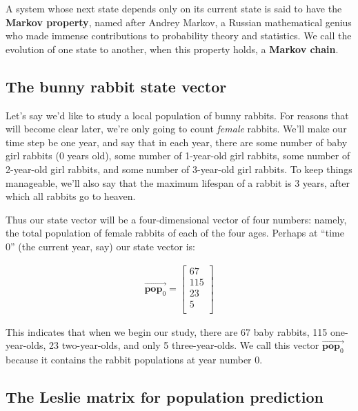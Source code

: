 
A system whose next state depends only on its current state is said to have the
\textbf{Markov property}, named after Andrey Markov, a Russian mathematical
genius who made immense contributions to probability theory and statistics. We
call the evolution of one state to another, when this property holds, a
\textbf{Markov chain}.

\subsection{The bunny rabbit state vector}


Let's say we'd like to study a local population of bunny rabbits. For reasons
that will become clear later, we're only going to count \textit{female}
rabbits. We'll make our time step be one year, and say that in each year, there
are some number of baby girl rabbits (0 years old), some number of 1-year-old
girl rabbits, some number of 2-year-old girl rabbits, and some number of
3-year-old girl rabbits. To keep things manageable, we'll also say that the
maximum lifespan of a rabbit is 3 years, after which all rabbits go to heaven.

Thus our state vector will be a four-dimensional vector of four numbers:
namely, the total population of female rabbits of each of the four ages.
Perhaps at ``time 0'' (the current year, say) our state vector is:

\vspace{-.15in}
\begin{align*}
\overrightarrow{\textbf{pop}_0} =
\begin{bmatrix}
67 \\ 115 \\ 23 \\ 5 \\
\end{bmatrix}
\end{align*}
\vspace{-.15in}

This indicates that when we begin our study, there are 67 baby rabbits, 115
one-year-olds, 23 two-year-olds, and only 5 three-year-olds. We call this
vector $\overrightarrow{\textbf{pop}_0}$ because it contains the rabbit
populations at year number 0.

\subsection{The Leslie matrix for population prediction}

